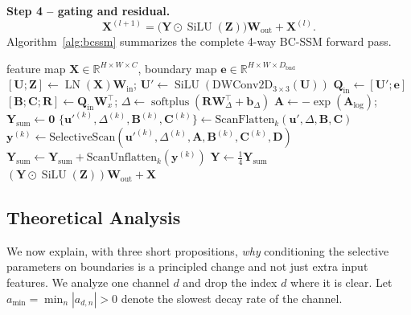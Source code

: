 \documentclass[journal]{IEEEtran}
\newcommand{\R}{\mathbb{R}}
\newcommand{\vect}[1]{\bm{#1}}
\newcommand{\softplus}{\operatorname{softplus}}
\newcommand{\SiLU}{\operatorname{SiLU}}
\newcommand{\LN}{\operatorname{LN}}
\newcommand{\Dt}{\Delta}
\begin{document}
\textbf{Step 4 -- gating and residual.}
\begin{equation}
  \vect{X}^{(l+1)} = \big(\vect{Y}\odot\SiLU(\vect{Z})\big)\vect{W}_{\text{out}} + \vect{X}^{(l)}.
  \label{eq:outproj}
\end{equation}
Algorithm~\ref{alg:bcssm} summarizes the complete 4-way BC-SSM forward pass.

\begin{algorithm}[t]
\caption{Forward pass of 4-Way BC-SSM block}
\label{alg:bcssm}
\begin{algorithmic}[1]
\Require feature map $\vect{X}\in\R^{H\times W\times C}$, boundary map $\vect{e}\in\R^{H\times W\times D_{\text{bnd}}}$
\State $[\vect{U};\vect{Z}]\gets\LN(\vect{X})\vect{W}_{\text{in}}$;\; $\vect{U}'\gets\SiLU(\mathrm{DWConv2D}_{3\times3}(\vect{U}))$
\State $\vect{Q}_{\text{in}}\gets[\vect{U}';\vect{e}]$ 
\State $[\vect{B};\vect{C};\vect{R}]\gets\vect{Q}_{\text{in}}\vect{W}_x^{\top}$;\; $\Dt\gets\softplus(\vect{R}\vect{W}_\Dt^{\top}+\vect{b}_\Dt)$
\State $\vect{A}\gets-\exp(\vect{A}_{\log})$;\; $\vect{Y}_{\text{sum}}\gets\vect{0}$
 
  \State $\{\vect{u}'^{(k)},\Dt^{(k)},\vect{B}^{(k)},\vect{C}^{(k)}\}\gets\mathrm{ScanFlatten}_k(\vect{u}',\Dt,\vect{B},\vect{C})$
  \State $\vect{y}^{(k)}\gets\mathrm{SelectiveScan}(\vect{u}'^{(k)},\Dt^{(k)},\vect{A},\vect{B}^{(k)},\vect{C}^{(k)},\vect{D})$
  \State $\vect{Y}_{\text{sum}}\gets\vect{Y}_{\text{sum}}+\mathrm{ScanUnflatten}_k(\vect{y}^{(k)})$
\EndFor
\State $\vect{Y}\gets\frac{1}{4}\vect{Y}_{\text{sum}}$
\State \Return $(\vect{Y}\odot\SiLU(\vect{Z}))\vect{W}_{\text{out}}+\vect{X}$
\end{algorithmic}
\end{algorithm}

\subsection{Theoretical Analysis}
\label{sec:theory}
We now explain, with three short propositions, \emph{why} conditioning the selective parameters on boundaries is a principled change and not just extra input features. We analyze one channel $d$ and drop the index $d$ where it is clear. Let $a_{\min}=\min_n |a_{d,n}|>0$ denote the slowest decay rate of the channel.
\end{document}

